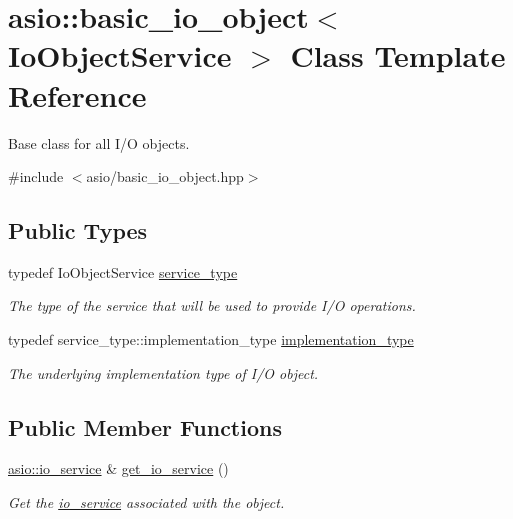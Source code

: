 \hypertarget{classasio_1_1basic__io__object}{}\section{asio\+:\+:basic\+\_\+io\+\_\+object$<$ Io\+Object\+Service $>$ Class Template Reference}
\label{classasio_1_1basic__io__object}


Base class for all I/\+O objects.  




{\ttfamily \#include $<$asio/basic\+\_\+io\+\_\+object.\+hpp$>$}

\subsection*{Public Types}
\begin{DoxyCompactItemize}
\item 
typedef Io\+Object\+Service \hyperlink{classasio_1_1basic__io__object_aee6c059b568e190966f1307cc21a264d}{service\+\_\+type}
\begin{DoxyCompactList}\small\item\em The type of the service that will be used to provide I/\+O operations. \end{DoxyCompactList}\item 
typedef service\+\_\+type\+::implementation\+\_\+type \hyperlink{classasio_1_1basic__io__object_a36e6f136c8c1249242e81597c34d8d29}{implementation\+\_\+type}
\begin{DoxyCompactList}\small\item\em The underlying implementation type of I/\+O object. \end{DoxyCompactList}\end{DoxyCompactItemize}
\subsection*{Public Member Functions}
\begin{DoxyCompactItemize}
\item 
\hyperlink{classasio_1_1io__service}{asio\+::io\+\_\+service} \& \hyperlink{classasio_1_1basic__io__object_a0b873ee7c623f0c37404fd0884765ab9}{get\+\_\+io\+\_\+service} ()
\begin{DoxyCompactList}\small\item\em Get the \hyperlink{classasio_1_1io__service}{io\+\_\+service} associated with the object. \end{DoxyCompactList}\end{DoxyCompactItemize}
